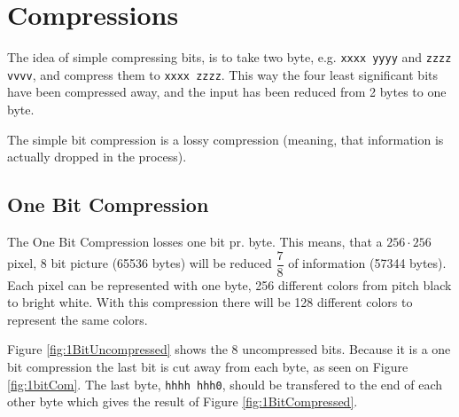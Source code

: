 \section{Compressions}

The idea of simple compressing bits, is to take two byte, e.g. \texttt{xxxx yyyy} and \texttt{zzzz vvvv}, and compress them to \texttt{xxxx zzzz}.
This way the four least significant bits have been compressed away, and the input has been reduced from 2 bytes to one byte.

The simple bit compression is a lossy compression (meaning, that information is actually dropped in the process).


\subsection{One Bit Compression} %
\label{sub:one_bit_compression}
\FloatBarrier

The One Bit Compression losses one bit pr. byte.
This means, that a $256 \cdot 256$ pixel, 8 bit picture (65536 bytes) will be reduced $\dfrac{7}{8}$ of information (57344 bytes).
Each pixel can be represented with one byte, 256 different colors from pitch black to bright white.
With this compression there will be 128 different colors to represent the same colors.

Figure \ref{fig:1BitUncompressed} shows the 8 uncompressed bits. 
Because it is a one bit compression the last bit is cut away from each byte, as seen on Figure \ref{fig:1bitCom}.
The last byte, \texttt{hhhh hhh0}, should be transfered to the end of each other byte which gives the result of Figure \ref{fig:1BitCompressed}.


